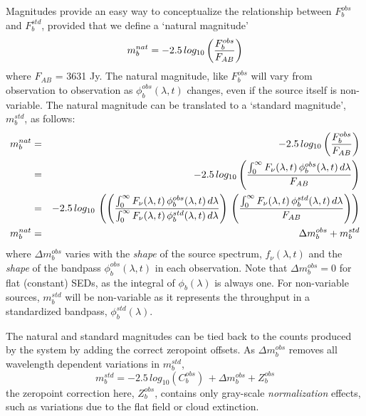 \documentclass[12pt,preprint]{aastex}
\begin{document}
Magnitudes provide an easy way to conceptualize the relationship
between $F_b^{obs}$ and $F_b^{std}$, provided that we define a
`natural magnitude' 
\begin{equation}
\label{eqn:natmag}
m_b^{nat}  = -2.5\, log_{10} \left( {F_b^{obs} \over F_{AB}}  \right)
\end{equation}
where $F_{AB}$ = 3631 Jy. The natural magnitude, like $F_b^{obs}$ will
vary from observation to observation as $\phi_b^{obs}(\lambda,t)$
changes, even if the source itself is non-variable. The natural
magnitude can be translated to a `standard magnitude', $m_b^{std}$, as
follows:
\begin{eqnarray}
m_b^{nat} & = &-2.5\, log_{10} \left( {F_b^{obs} \over F_{AB}} \right) \\
& = & -2.5 \, log_{10} \left( { \int_0^\infty {F_\nu(\lambda,t) \,
    \phi_b^{obs}(\lambda,t) \, d\lambda} \over F_{AB} }  \right) \\
& = & -2.5 \, log_{10} \, \left( \left( { \int_0^\infty {F_\nu(\lambda,t) \,
    \phi_b^{obs}(\lambda,t) \, d\lambda} \over \int_0^\infty {F_\nu(\lambda,t) \,
    \phi_b^{std}(\lambda,t) \, d\lambda}} \right) \, \left( {\int_0^\infty {F_\nu(\lambda,t) \,
    \phi_b^{std}(\lambda,t) \, d\lambda} \over F_{AB}} \right) \right) \\
m_b^{nat} & = & \Delta m_b^{obs} + m_b^{std} 
\end{eqnarray}
where $\Delta m_b^{obs}$ varies with the {\it shape} of the source
spectrum, $f_\nu(\lambda,t)$ and the {\it shape} of the bandpass
$\phi_b^{obs}(\lambda,t)$ in each observation. Note that $\Delta
m_b^{obs}=0$ for flat (constant) SEDs, as the integral of
$\phi_b(\lambda)$ is always one.  For non-variable sources,
$m_b^{std}$ will be non-variable as it represents the throughput in a
standardized bandpass, $\phi_b^{std}(\lambda)$.

The natural and standard magnitudes can be tied back to the counts
produced by the system by adding the correct zeropoint offsets. As
$\Delta m_b^{obs}$ removes all wavelength dependent variations in $m_b^{std}$,
\begin{equation}
\label{eqn:mag2counts}
m_b^{std} = -2.5\,log_{10}(C_b^{obs}) \, + \Delta m_b^{obs} + Z_b^{obs}
\end{equation}
the zeropoint correction here, $Z_b^{obs}$, contains only gray-scale
{\it normalization} effects, such as variations due to the flat field
or cloud extinction. 
\end{document}
